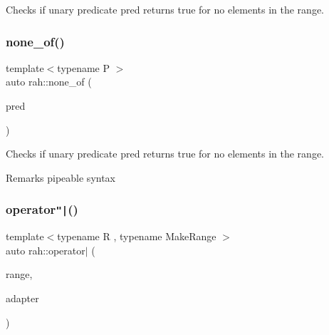 Checks if unary predicate pred returns true for no elements in the range. 


\begin{DoxyCodeInclude}{0}
\DoxyCodeLine{    ));}
\end{DoxyCodeInclude}
\mbox{\label{namespacerah_aa05e58774ee8e9e05cd3e6ed2a2fa372}} 
\subsubsection{\texorpdfstring{none\_of()}{none\_of()}\hspace{0.1cm}{\footnotesize\ttfamily [2/2]}}
{\footnotesize\ttfamily template$<$typename P $>$ \\
auto rah\+::none\+\_\+of (\begin{DoxyParamCaption}\item[{P \&\&}]{pred }\end{DoxyParamCaption})}



Checks if unary predicate pred returns true for no elements in the range. 

\begin{DoxyRemark}{Remarks}
pipeable syntax
\end{DoxyRemark}

\begin{DoxyCodeInclude}{0}
\DoxyCodeLine{    ) == \textcolor{keyword}{false});}
\end{DoxyCodeInclude}
\mbox{\label{namespacerah_a5c6923b0ef49c831571590f953253ff9}} 
\subsubsection{\texorpdfstring{operator\texttt{"|}()}{operator|()}}
{\footnotesize\ttfamily template$<$typename R , typename Make\+Range $>$ \\
auto rah\+::operator$\vert$ (\begin{DoxyParamCaption}\item[{R \&\&}]{range,  }\item[{\mbox{\hyperlink{structrah_1_1pipeable}{pipeable}}$<$ Make\+Range $>$ const \&}]{adapter }\end{DoxyParamCaption})}

